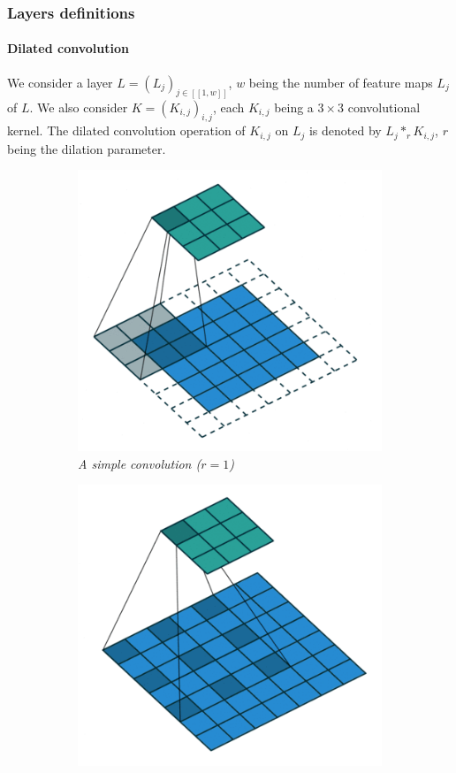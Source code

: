 \documentclass{article}
\begin{document}
        \subsubsection{Layers definitions}

            \paragraph{Dilated convolution}\label{par:dilated} We consider a layer $L=(L_j)_{j\in [\![1,w]\!]}$, $w$ being the number of feature maps $L_j$ of $L$. We also consider $K=(K_{i,j})_{i,j}$, each $K_{i,j}$ being a $3\times 3$ convolutional kernel. The dilated convolution operation of $K_{i,j}$ on $L_j$ is denoted by $L_j*_r K_{i,j}$, $r$ being the dilation parameter.

            \begin{figure}[!ht]
                \begin{subfigure}{.49\linewidth}
                    \centering
                    \includegraphics[width=.8\linewidth]{pics/conv-simple.png}
                    \caption{\textit{A simple convolution ($r=1$)}}
                    \label{fig:conv-simple}
                \end{subfigure}
                \begin{subfigure}{.49\linewidth}
                    \centering
                    \includegraphics[width=.8\linewidth]{pics/conv-dilated.png}

\end{subfigure}
\end{figure}
\end{document}
